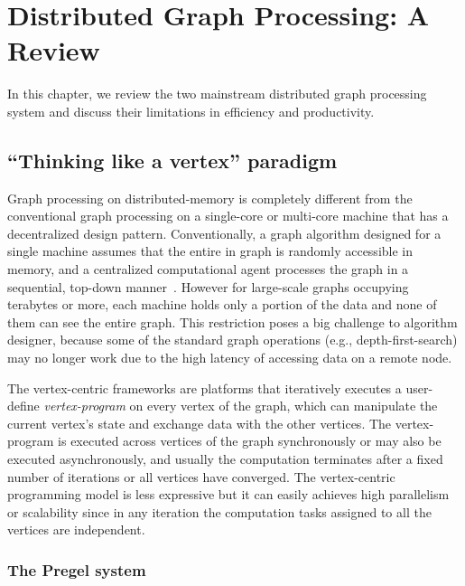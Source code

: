 \documentclass{sokendai_thesis} %
\begin{document}
\chapter{Distributed Graph Processing: A Review}
\label{chap:review}

In this chapter, we review the two mainstream distributed graph processing system and discuss their limitations in efficiency and productivity.

\section{``Thinking like a vertex'' paradigm}

Graph processing on distributed-memory is completely different from the conventional graph processing on a single-core or multi-core machine that has a decentralized design pattern.
Conventionally, a graph algorithm designed for a single machine assumes that the entire in graph is randomly accessible in memory, and a centralized computational agent processes the graph in a sequential, top-down manner~\cite{survey}.
However for large-scale graphs occupying terabytes or more, each machine holds only a portion of the data and none of them can see the entire graph.
This restriction poses a big challenge to algorithm designer, because some of the standard graph operations (e.g., depth-first-search) may no longer work due to the high latency of accessing data on a remote node.

The vertex-centric frameworks are platforms that iteratively executes a user-define \emph{vertex-program} on every vertex of the graph, which can manipulate the current vertex's state and exchange data with the other vertices.
The vertex-program is executed across vertices of the graph synchronously or may also be executed asynchronously, and usually the computation terminates after a fixed number of iterations or all vertices have converged.
The vertex-centric programming model is less expressive but it can easily achieves high parallelism or scalability since in any iteration the computation tasks assigned to all the vertices are independent.


\subsection{The Pregel system}
\end{document}
